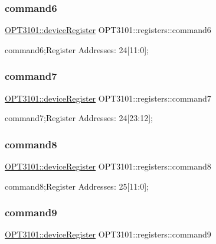 \subsubsection{\texorpdfstring{command6}{command6}}
{\footnotesize\ttfamily \mbox{\hyperlink{class_o_p_t3101_1_1device_register}{O\+P\+T3101\+::device\+Register}} O\+P\+T3101\+::registers\+::command6}



command6;Register Addresses\+: 24\mbox{[}11\+:0\mbox{]}; 

\mbox{\label{class_o_p_t3101_1_1registers_a5f75ef646ef57b564c401756f6a32531}} 
\subsubsection{\texorpdfstring{command7}{command7}}
{\footnotesize\ttfamily \mbox{\hyperlink{class_o_p_t3101_1_1device_register}{O\+P\+T3101\+::device\+Register}} O\+P\+T3101\+::registers\+::command7}



command7;Register Addresses\+: 24\mbox{[}23\+:12\mbox{]}; 

\mbox{\label{class_o_p_t3101_1_1registers_ace1ee1c323057d120e63bdc578a077c5}} 
\subsubsection{\texorpdfstring{command8}{command8}}
{\footnotesize\ttfamily \mbox{\hyperlink{class_o_p_t3101_1_1device_register}{O\+P\+T3101\+::device\+Register}} O\+P\+T3101\+::registers\+::command8}



command8;Register Addresses\+: 25\mbox{[}11\+:0\mbox{]}; 

\mbox{\label{class_o_p_t3101_1_1registers_a5b64854b22e45043f666d9c7857b2b56}} 
\subsubsection{\texorpdfstring{command9}{command9}}
{\footnotesize\ttfamily \mbox{\hyperlink{class_o_p_t3101_1_1device_register}{O\+P\+T3101\+::device\+Register}} O\+P\+T3101\+::registers\+::command9}



